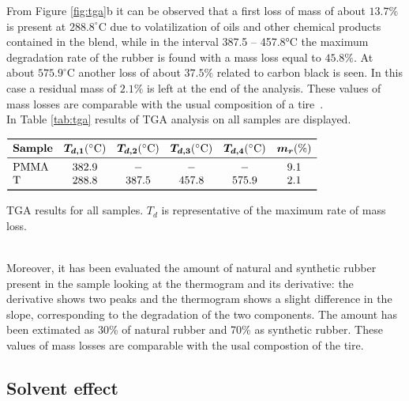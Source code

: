 \documentclass[a4paper, 11pt]{article}
\begin{document}
\newpage

From Figure \ref{fig:tga}b it can be observed that a first loss of mass of about $13.7\%$ is present at $288.8^\circ$C due to volatilization of oils and other chemical products contained in the blend, while in the interval 387.5 – 457.8°C the maximum degradation rate of the rubber is found with a mass loss equal to $45.8\%$. At about $575.9^\circ$C another loss of about $37.5\%$ related to carbon black is seen. In this case a residual mass of $2.1\%$ is left at the end of the analysis. These values of mass losses are comparable with the usual composition of a tire~\cite{gommista}.\\
In Table \ref{tab:tga} results of TGA analysis on all samples are displayed. 
\begin{table}[htp]
\centering
$
\begin{array}{lccccc}
\toprule
\textbf{Sample}  & \bm{T_{d,1}} (\SI{}{\celsius}) & \bm{T_{d,2}} (\SI{}{\celsius}) & \bm{T_{d,3}} (\SI{}{\celsius}) & \bm{T_{d,4}} (\SI{}{\celsius}) & \bm{m_{r}} (\si{\%}) \\
\midrule
\text{PMMA}  & 382.9 & - & - & - & 9.1  \\
\text{T}  & 288.8 & 387.5 & 457.8 & 575.9 & 2.1  \\
\bottomrule
\end{array}
$
\caption{TGA results for all samples. $T_d$ is representative of the maximum rate of mass loss.}
\label{tab:tga}
\end{table}\\
Moreover, it has been evaluated the amount of natural and synthetic rubber present in the sample looking at the thermogram and its derivative: the derivative shows two peaks and the thermogram shows a slight difference in the slope, corresponding to the degradation of the two components. The amount has been extimated as 30\% of natural rubber and 70\% as synthetic rubber. These values of mass losses are comparable with the usal compostion of the tire.

\subsection{Solvent effect}
\end{document}
